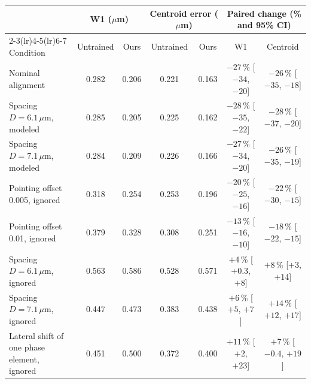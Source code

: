 \begin{tabular}{@{}lcccccc@{}}
\toprule
& \multicolumn{2}{c}{W1 ($\mu$m)} & \multicolumn{2}{c}{Centroid error ($\mu$m)} & \multicolumn{2}{c}{Paired change (\% and 95\% CI)} \\
\cmidrule(lr){2-3}\cmidrule(lr){4-5}\cmidrule(lr){6-7}
Condition & Untrained & Ours & Untrained & Ours & W1 & Centroid \\
\midrule
Nominal alignment & 0.282 & 0.206 & 0.221 & 0.163 & $-27$\,\% [$-34$, $-20$] & $-26$\,\% [$-35$, $-18$]\\
Spacing $D=6.1\,\mu$m, modeled & 0.285 & 0.205 & 0.225 & 0.162 & $-28$\,\% [$-35$, $-22$] & $-28$\,\% [$-37$, $-20$]\\
Spacing $D=7.1\,\mu$m, modeled & 0.284 & 0.209 & 0.226 & 0.166 & $-27$\,\% [$-34$, $-20$] & $-26$\,\% [$-35$, $-19$]\\
Pointing offset 0.005, ignored & 0.318 & 0.254 & 0.253 & 0.196 & $-20$\,\% [$-25$, $-16$] & $-22$\,\% [$-30$, $-15$]\\
Pointing offset 0.01, ignored & 0.379 & 0.328 & 0.308 & 0.251 & $-13$\,\% [$-16$, $-10$] & $-18$\,\% [$-22$, $-15$]\\
Spacing $D=6.1\,\mu$m, ignored & 0.563 & 0.586 & 0.528 & 0.571 & $+4$\,\% [$+0.3$, $+8$] & $+8$\,\% [$+3$, $+14$]\\
Spacing $D=7.1\,\mu$m, ignored & 0.447 & 0.473 & 0.383 & 0.438 & $+6$\,\% [$+5$, $+7$] & $+14$\,\% [$+12$, $+17$]\\
Lateral shift of one phase element, ignored & 0.451 & 0.500 & 0.372 & 0.400 & $+11$\,\% [$+2$, $+23$] & $+7$\,\% [$-0.4$, $+19$]\\
\bottomrule
\end{tabular}
